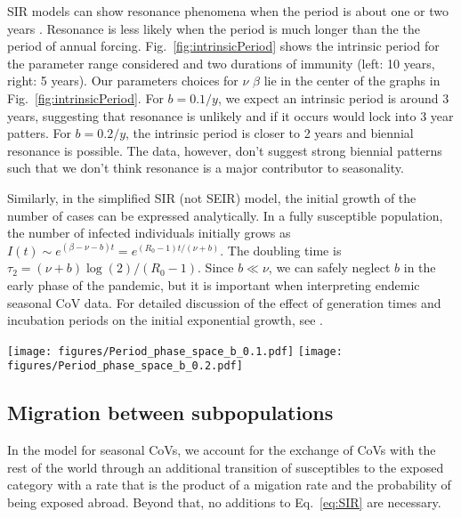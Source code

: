 \documentclass[rmp, reprint, superscriptaddress, floatfix,amsmath]{revtex4-1}
\begin{document}
SIR models can show resonance phenomena when the period is about one or two years \citep{dushoff_dynamical_2004,chen_regular_2017}.
Resonance is less likely when the period is much longer than the the period of annual forcing.
Fig.~\ref{fig:intrinsicPeriod} shows the intrinsic period for the parameter range considered and two durations of immunity (left: 10 years, right: 5 years). 
Our parameters choices for $\nu$ $\beta$ lie in the center of the graphs in Fig.~\ref{fig:intrinsicPeriod}. 
For $b=0.1/y$, we expect an intrinsic period is around 3 years, suggesting that resonance is unlikely and if it occurs would lock into 3 year patters.
For $b=0.2/y$, the intrinsic period is closer to 2 years and biennial resonance is possible. 
The data, however, don't suggest strong biennial patterns such that we don't think resonance is a major contributor to seasonality.

Similarly, in the simplified SIR (not SEIR) model, the initial growth of the number of cases can be expressed analytically.
In a fully susceptible population, the number of infected individuals initially grows as $I(t)\sim e^{(\beta-\nu-b)t} = e^{(R_0-1)t/(\nu+b)}$.
The doubling time is $\tau_2 = (\nu+b)\log(2)/(R_0-1)$.
Since $b\ll \nu$, we can safely neglect $b$ in the early phase of the pandemic, but it is important when interpreting endemic seasonal CoV data. 
For detailed discussion of the effect of generation times and incubation periods on the initial exponential growth, see \citep{wallinga_how_2007}.


\begin{figure*}[htb]
	\centering
	\texttt{[image: figures/Period\_phase\_space\_b\_0.1.pdf]}
	\texttt{[image: figures/Period\_phase\_space\_b\_0.2.pdf]}
\caption{Length of the intrinsic period of the SIR model for $\beta$ and $\nu$ values in the range explored in this paper. The duration of immunity is assumed to be $10$ years in the panel on the left and 5 years in the panel on the right. The dark blue region corresponds to $R_0<1$. }
	\label{fig:intrinsicPeriod}
\end{figure*}


\subsection*{Migration between subpopulations}

In the model for seasonal CoVs, we account for the exchange of CoVs with the rest of the world through an additional transition of susceptibles to the exposed category with a rate that is the product of a migation rate and the probability of being exposed abroad. 
Beyond that, no additions to Eq.~\ref{eq:SIR} are necessary.
\end{document}
